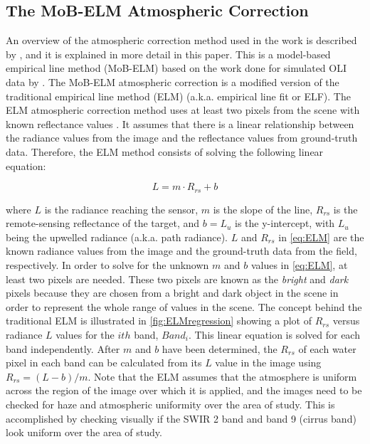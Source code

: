 \documentclass[onecolumn,3p,letterpaper,11pt]{elsarticle}
\begin{document}
\subsection{The MoB-ELM Atmospheric Correction}
An overview of the atmospheric correction method used in the work is described by \citet{Concha2014SPIE}, and it is explained in more detail in this paper. This is a model-based empirical line method (MoB-ELM) based on the work done for simulated OLI data by \citet{Gerace:2012}. The MoB-ELM atmospheric correction is a modified version of the traditional empirical line method (ELM) (a.k.a. empirical line fit or ELF). The ELM atmospheric correction method uses at least two pixels from the scene with known reflectance values \citep{Schott}. It assumes that there is a linear relationship between the radiance values from the image and the reflectance values from ground-truth data. Therefore, the ELM method consists of solving the following linear equation:

\begin{equation}\label{eq:ELM} 
	L = m\cdot R_{rs} + b
\end{equation}

\noindent where $L$ is the radiance reaching the sensor, $m$ is the slope of the line, $R_{rs}$ is the remote-sensing reflectance of the target, and $b=L_u$ is the y-intercept, with $L_u$ being the upwelled radiance (a.k.a. path radiance). $L$ and $R_{rs}$ in \autoref{eq:ELM} are the known radiance values from the image and the ground-truth data from the field, respectively. In order to solve for the unknown $m$ and $b$ values in \autoref{eq:ELM}, at least two pixels are needed. These two pixels are known as the {\it bright} and {\it dark} pixels because they are chosen from a bright and dark object in the scene in order to represent the whole range of values in the scene. The concept behind the traditional ELM is illustrated in \autoref{fig:ELMregression} showing a plot of $R_{rs}$ versus radiance $L$ values for the $ith$ band, $Band_{i}$. This linear equation is solved for each band independently. After $m$ and $b$ have been determined, the $R_{rs}$ of each water pixel in each band can be calculated from its $L$ value in the image using $R_{rs}=(L-b)/m$. Note that the ELM assumes that the atmosphere is uniform across the region of the image over which it is applied, and the images need to be checked for haze and atmospheric uniformity over the area of study. This is accomplished by checking visually if the SWIR 2 band and band 9 (cirrus band) look uniform over the area of study.
\end{document}
